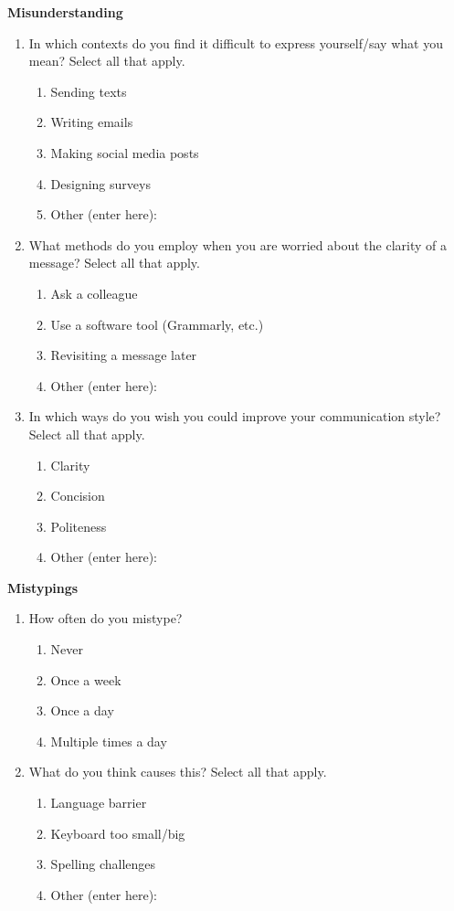 \documentclass[acmsmall,screen,authorversion,nonacm]{acmart}
\begin{document}
\textbf{Misunderstanding}
\begin{enumerate}
    \item In which contexts do you find it difficult to express yourself/say what you mean? Select all that apply.
        \begin{enumerate}
            \item Sending texts
            \item Writing emails
            \item Making social media posts
            \item Designing surveys
            \item Other (enter here):
        \end{enumerate}
    \item What methods do you employ when you are worried about the clarity of a message? Select all that apply.
        \begin{enumerate}
            \item Ask a colleague
            \item Use a software tool (Grammarly, etc.)
            \item Revisiting a message later
            \item Other (enter here):
        \end{enumerate}
    \item In which ways do you wish you could improve your communication style? Select all that apply.
        \begin{enumerate}
            \item Clarity
            \item Concision
            \item Politeness
            \item Other (enter here):
        \end{enumerate}
\end{enumerate}

\textbf{Mistypings}
\begin{enumerate}
    \item How often do you mistype?
        \begin{enumerate}
            \item Never
            \item Once a week
            \item Once a day
            \item Multiple times a day
        \end{enumerate}
    \item What do you think causes this? Select all that apply.
        \begin{enumerate}
            \item Language barrier
            \item Keyboard too small/big
            \item Spelling challenges
            \item Other (enter here):
        \end{enumerate}

\end{enumerate}
\end{document}
